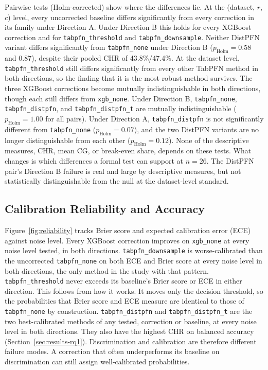 Pairwise tests (Holm-corrected) show where the differences lie. At the (dataset, $r$,
$c$) level, every uncorrected baseline differs significantly from every correction in
its family under Direction A. Under Direction B this holds for every XGBoost
correction and for \texttt{tabpfn\_threshold} and \texttt{tabpfn\_downsample}. Neither
DistPFN variant differs significantly from \texttt{tabpfn\_none} under Direction B
($p_{\text{Holm}}=0.58$ and $0.87$), despite their pooled CHR of 43.8\%/47.4\%. At the
dataset level, \texttt{tabpfn\_threshold} still differs significantly from every other
TabPFN method in both directions, so the finding that it is the most robust method
survives. The three XGBoost corrections become mutually indistinguishable in both
directions, though each still differs from \texttt{xgb\_none}. Under Direction B,
\texttt{tabpfn\_none}, \texttt{tabpfn\_distpfn}, and \texttt{tabpfn\_distpfn\_t} are
mutually indistinguishable ($p_{\text{Holm}}=1.00$ for all pairs). Under Direction A,
\texttt{tabpfn\_distpfn} is not significantly different from \texttt{tabpfn\_none}
($p_{\text{Holm}}=0.07$), and the two DistPFN variants are no longer distinguishable
from each other ($p_{\text{Holm}}=0.12$). None of the descriptive measures, CHR, mean
CG, or break-even share, depends on these tests. What changes is which differences a
formal test can support at $n{=}26$. The DistPFN pair's Direction B failure is real
and large by descriptive measures, but not statistically distinguishable from the
null at the dataset-level standard.

\subsection{Calibration Reliability and Accuracy}
\label{sec:results-reliability}
\label{sec:discussion-calibration}

Figure~\ref{fig:reliability} tracks Brier score and expected calibration error (ECE)
against noise level. Every XGBoost correction improves on \texttt{xgb\_none} at every
noise level tested, in both directions. \texttt{tabpfn\_downsample} is worse-calibrated
than the uncorrected \texttt{tabpfn\_none} on both ECE and Brier score at every noise
level in both directions, the only method in the study with that pattern. \texttt{tabpfn\_threshold} never exceeds its baseline's Brier score or ECE in
either direction. This follows from how it works. It moves only the decision threshold,
so the probabilities that Brier score and ECE measure are identical to those of
\texttt{tabpfn\_none} by construction. \texttt{tabpfn\_distpfn} and
\texttt{tabpfn\_distpfn\_t} are the two best-calibrated methods of any tested, correction
or baseline, at every noise level in both directions. They also have the highest CHR on
balanced accuracy (Section~\ref{sec:results-rq1}). Discrimination and calibration are
therefore different failure modes. A correction that often underperforms its baseline on
discrimination can still assign well-calibrated probabilities.

